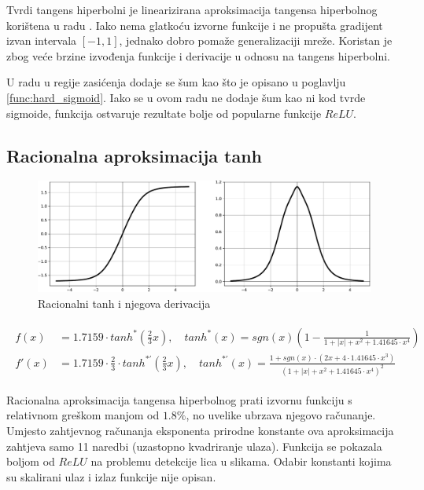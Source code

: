 \documentclass[times, utf8, numeric, diplomski]{fer}
\begin{document}
Tvrdi tangens hiperbolni je linearizirana aproksimacija tangensa hiperbolnog korištena u radu \citet{collobert_phd}. Iako nema glatkoću izvorne funkcije i ne propušta gradijent izvan intervala $[-1,1]$, jednako dobro pomaže generalizaciji mreže. Koristan je zbog veće brzine izvođenja funkcije i derivacije u odnosu na tangens hiperbolni.

U radu \citet{hardsigm} u regije zasićenja dodaje se šum kao što je opisano u poglavlju \ref{func:hard_sigmoid}. Iako se u ovom radu ne dodaje šum kao ni kod tvrde sigmoide, funkcija ostvaruje rezultate bolje od popularne funkcije $ReLU$.

\subsection{Racionalna aproksimacija tanh}

\begin{figure}[H]
\includegraphics[width=\textwidth]{func_Rational_tanh.pdf}
\centering
\caption{Racionalni tanh i njegova derivacija}
\label{fig:rational_tanh}
\end{figure}

\begin{align}
\label{eq:rattanh}
\begin{split}
f(x) &= 1.7159 \cdot tanh^*(\frac{2}{3}x), \quad
tanh^*(x) = sgn(x)(1 - \frac{1}{1 + |x| + x^2 + 1.41645 \cdot x^4}) \\
f'(x) &= 1.7159 \cdot \frac{2}{3} \cdot tanh^{*'}(\frac{2}{3}x), \quad
tanh^{*'}(x) = \frac{1+sgn(x) \cdot (2x + 4 \cdot 1.41645 \cdot x^3)}{(1 + |x| + x^2 + 1.41645 \cdot x^4)^2}
\end{split}
\end{align}

Racionalna aproksimacija tangensa hiperbolnog prati izvornu funkciju s relativnom greškom manjom od $1.8\%$, no uvelike ubrzava njegovo računanje. Umjesto zahtjevnog računanja eksponenta prirodne konstante ova aproksimacija zahtjeva samo 11 naredbi (uzastopno kvadriranje ulaza). Funkcija se pokazala boljom od $ReLU$ na problemu detekcije lica u slikama. Odabir konstanti kojima su skalirani ulaz i izlaz funkcije nije opisan. \citep{rattanh}
\end{document}
